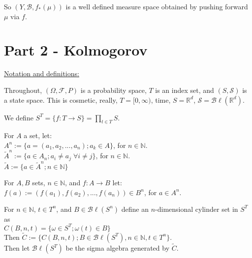\documentclass[12pt]{article}
\newcommand{\nats}[0] { \mathbb{N}}
\newcommand{\reals}[0] { \mathbb{R}}
\newcommand{\B}[0] { \mathcal{B} }
\newcommand{\F}[0] { \mathcal{F} }
\newcommand{\om}[0] { \omega }
\newcommand{\Om}[0] { \Omega }
\newcommand{\Bl}[0] { \mathcal{B} \ell }
\newcommand{\rarw}[0] { \rightarrow }
\begin{document}
\begin{flushleft}
So $ (Y,\B,f_*(\mu))$ is a well defined measure space obtained by pushing forward $\mu$ via $f$.
\end{flushleft}





\section*{Part 2 - Kolmogorov }

\begin{flushleft}
\underline{Notation and definitions:}
\end{flushleft}

\begin{flushleft}
Throughout, $(\Om, \F, P )$ is a probability space, $T$ is an index set, and $(S, \mathcal{S} )$ is a state space. This is cosmetic, really, $T = [0, \infty )$, time, $S = \reals^d$, $\mathcal{S} = \Bl(\reals^d)$. 
\end{flushleft}

\begin{flushleft}
We define $S^T = \{ f: T \rightarrow S \} = \prod_{t \in T} S$. 
\end{flushleft}

\begin{flushleft}
For $A$ a set, let:\\
$A^n := \{ a = (a_1, a_2, ..., a_n ) ; a_k \in A  \}$, for $n \in \nats$.\\
$\tilde{A}^n := \{ a \in A_n ; a_i \not = a_j \; \forall i \not = j  \}$, for $n \in \nats$. \\
$\tilde{A} := \{ a \in \tilde{A}^n; n \in \nats \}$
\end{flushleft}

\begin{flushleft}
For $A,B$ sets, $n \in \nats$, and $f: A \rarw B$ let:\\
$f(a) := ( f(a_1), f(a_2), ..., f(a_n) ) \in B^n$, for $a \in A^n$.  \\
\end{flushleft}

\begin{flushleft}
For $n \in \nats$, $t \in T^n$, and $B \in \Bl(S^n)$ define an $n$-dimensional cylinder set in $S^T$ as\\
$ C( B, n, t ) = \{ \om \in S^T; \om (t) \in B \} $\\
Then $\tilde{C} := \{ C( B, n, t ); B \in \Bl(S^T), n \in \nats, t \in T^n \}$. \\
Then let $\Bl(S^T)$ be the sigma algebra generated by $\tilde{C}$.
\end{flushleft}
\end{document}
